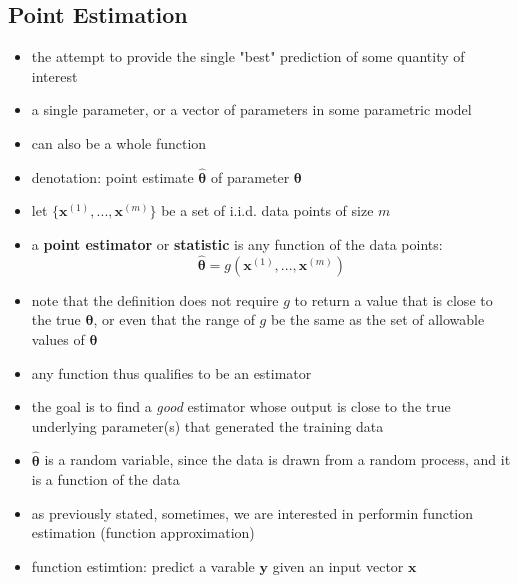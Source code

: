 \documentclass[11pt, twocolumn]{report}
\begin{document}
\subsection{Point Estimation}
\begin{itemize}
  \item the attempt to provide the single "best" prediction of some quantity of
    interest
  \item a single parameter, or a vector of parameters in some parametric model
  \item can also be a whole function
  \item denotation: point estimate $\hat{\bm{\theta}}$ of parameter
    $\bm{\theta}$
  \item let $\{\bm{x}^{(1)},...,\bm{x}^{(m)}\}$ be a set of i.i.d. data points
    of size $m$
  \item a \textbf{point estimator} or \textbf{statistic} is any function of the
    data points:
    \begin{equation}
      \hat{\bm{\theta}} = g(\bm{x}^{(1)},...,\bm{x}^{(m)})
    \end{equation}
  \item note that the definition does not require $g$ to return a value that is
    close to the true $\bm{\theta}$, or even that the range of $g$ be the same
    as the set of allowable values of $\bm{\theta}$
  \item any function thus qualifies to be an estimator
  \item the goal is to find a \textit{good} estimator whose output is close to
    the true underlying parameter(s) that generated the training data
  \item $\hat{\bm{\theta}}$ is a random variable, since the data is drawn from
    a random process, and it is a function of the data
  \item as previously stated, sometimes, we are interested in performin
    function estimation (function approximation)
  \item function estimtion: predict a varable $\bm{y}$ given an input vector
    $\bm{x}$
\end{itemize}
\end{document}
